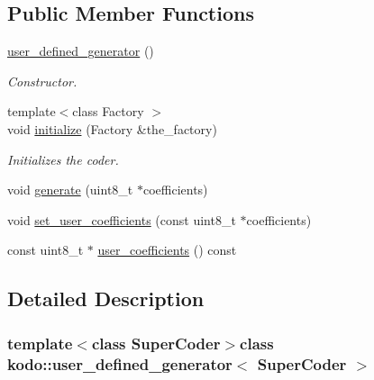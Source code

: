 \subsection*{Public Member Functions}
\begin{DoxyCompactItemize}
\item 
\hypertarget{classkodo_1_1user__defined__generator_a071d73519f3dceef49250d00d59df796}{\hyperlink{classkodo_1_1user__defined__generator_a071d73519f3dceef49250d00d59df796}{user\-\_\-defined\-\_\-generator} ()}\label{classkodo_1_1user__defined__generator_a071d73519f3dceef49250d00d59df796}

\begin{DoxyCompactList}\small\item\em Constructor. \end{DoxyCompactList}\item 
{\footnotesize template$<$class Factory $>$ }\\void \hyperlink{classkodo_1_1user__defined__generator_ae0e894bb737df14bf486bed83d780bdb}{initialize} (Factory \&the\-\_\-factory)
\begin{DoxyCompactList}\small\item\em Initializes the coder. \end{DoxyCompactList}\item 
void \hyperlink{classkodo_1_1user__defined__generator_a1e12cb072652f686ef0f4a8e7e6436fc}{generate} (uint8\-\_\-t $\ast$coefficients)
\begin{DoxyCompactList}\small\item\em \end{DoxyCompactList}\item 
void \hyperlink{classkodo_1_1user__defined__generator_a90a9fd664b818de9ff062c8cc5d4498b}{set\-\_\-user\-\_\-coefficients} (const uint8\-\_\-t $\ast$coefficients)
\item 
const uint8\-\_\-t $\ast$ \hyperlink{classkodo_1_1user__defined__generator_ae02b1ed10fac5bc96d161f7d05d1c771}{user\-\_\-coefficients} () const 
\end{DoxyCompactItemize}


\subsection{Detailed Description}
\subsubsection*{template$<$class Super\-Coder$>$class kodo\-::user\-\_\-defined\-\_\-generator$<$ Super\-Coder $>$}

